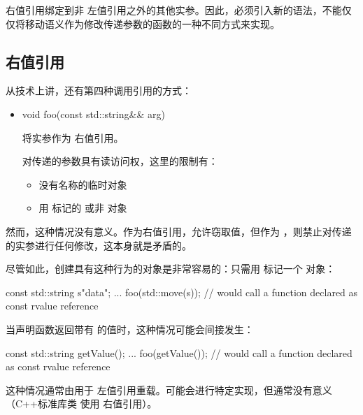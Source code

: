 右值引用绑定到非  左值引用之外的其他实参。因此，必须引入新的语法，不能仅仅将移动语义作为修改传递参数的函数的一种不同方式来实现。

\subsection{ 右值引用}

从技术上讲，还有第四种调用引用的方式：

\begin{itemize}
	\item \begin{cppcode}
void foo(const std::string\&\& arg)
\end{cppcode}
	将实参作为  右值引用。

	对传递的参数具有读访问权，这里的限制有：
	\begin{itemize}
		\item 没有名称的临时对象
		\item 用  标记的  或非  对象
	\end{itemize}
\end{itemize}

然而，这种情况没有意义。作为右值引用，允许窃取值，但作为 ，则禁止对传递的实参进行任何修改，这本身就是矛盾的。

尽管如此，创建具有这种行为的对象是非常容易的：只需用  标记一个  对象：

\begin{cppcode}
const std::string s{"data"};
...
foo(std::move(s)); // would call a function declared as const rvalue reference
\end{cppcode}

当声明函数返回带有  的值时，这种情况可能会间接发生：

\begin{cppcode}
const std::string getValue();
...
foo(getValue()); // would call a function declared as const rvalue reference
\end{cppcode}

这种情况通常由用于  左值引用重载。可能会进行特定实现，但通常没有意义（C++标准库类  使用  右值引用）。




















































